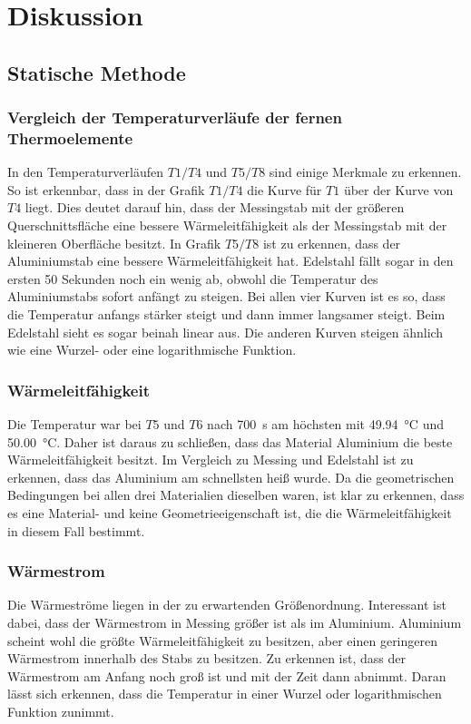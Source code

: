 \section{Diskussion}
\label{sec:Diskussion}

\subsection{Statische Methode}
\subsubsection{Vergleich der Temperaturverläufe der fernen Thermoelemente}
In den Temperaturverläufen $T1/T4$ und $T5/T8$ sind einige Merkmale zu erkennen. 
So ist erkennbar, dass in der Grafik $T1/T4$ die Kurve für $T1$ über der Kurve von $T4$ liegt. Dies deutet darauf hin, dass der Messingstab mit 
der größeren Querschnittsfläche eine bessere Wärmeleitfähigkeit als der Messingstab mit der kleineren Oberfläche besitzt. 
In Grafik $T5/T8$ ist zu erkennen, dass der Aluminiumstab eine bessere Wärmeleitfähigkeit hat. Edelstahl fällt sogar in den ersten 50 Sekunden 
noch ein wenig ab, obwohl die Temperatur des Aluminiumstabs sofort anfängt zu steigen. 
Bei allen vier Kurven ist es so, dass die Temperatur anfangs stärker steigt und dann immer langsamer steigt. Beim Edelstahl sieht es sogar 
beinah linear aus. Die anderen Kurven steigen ähnlich wie eine Wurzel- oder eine logarithmische Funktion.

\subsubsection{Wärmeleitfähigkeit}
Die Temperatur war bei $T5$ und $T6$ nach \SI{700}{\second} am höchsten mit \SI{49.94}{\degreeCelsius} und \SI{50.00}{\degreeCelsius}. Daher 
ist daraus zu schließen, dass das Material Aluminium die beste Wärmeleitfähigkeit besitzt. 
Im Vergleich zu Messing und Edelstahl ist zu erkennen, dass das Aluminium  am schnellsten heiß wurde. Da die geometrischen
Bedingungen bei allen drei Materialien dieselben waren, ist klar zu erkennen, dass es eine Material- und keine
Geometrieeigenschaft ist, die die Wärmeleitfähigkeit in diesem Fall bestimmt.

\subsubsection{Wärmestrom}
Die Wärmeströme liegen in der zu erwartenden Größenordnung. Interessant ist dabei, dass der Wärmestrom in Messing größer ist als im Aluminium. 
Aluminium scheint wohl die größte Wärmeleitfähigkeit zu besitzen, aber einen geringeren Wärmestrom innerhalb des Stabs zu besitzen. 
Zu erkennen ist, dass der Wärmestrom am Anfang noch groß ist und mit der Zeit dann abnimmt. Daran lässt sich erkennen, dass die Temperatur 
in einer Wurzel oder logarithmischen Funktion zunimmt.

